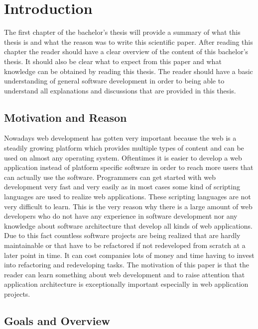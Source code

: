 \chapter{Introduction}
\label{cha:Introduction}


The first chapter of the bachelor's thesis will provide a summary of what this thesis is and what the reason was to write this scientific paper. After reading this chapter the reader should have a clear overview of the content of this bachelor's thesis. It should also be clear what to expect from this paper and what knowledge can be obtained by reading this thesis. The reader should have a basic understanding of general software development in order to being able to understand all explanations and discussions that are provided in this thesis. 

\section{Motivation and Reason}

Nowadays web development has gotten very important because the web is a steadily growing platform which provides multiple types of content and can be used on almost any operating system. Oftentimes it is easier to develop a web application instead of platform specific software in order to reach more users that can actually use the software. Programmers can get started with web development very fast and very easily as in most cases some kind of scripting languages are used to realize web applications. These scripting languages are not very difficult to learn. This is the very reason why there is a large amount of web developers who do not have any experience in software development nor any knowledge about software architecture that develop all kinds of web applications. Due to this fact countless software projects are being realized that are hardly maintainable or that have to be refactored if not redeveloped from scratch at a later point in time. It can cost companies lots of money and time having to invest into refactoring and redeveloping tasks. The motivation of this paper is that the reader can learn something about web development and to raise attention that application architecture is exceptionally important especially in web application projects.

\section{Goals and Overview}

